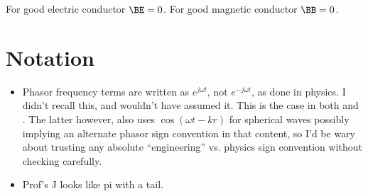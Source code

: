 For good electric conductor \( \BE = 0 \).
For good magnetic conductor \( \BB = 0 \).

\section{Notation}

\begin{itemize}
\item Phasor frequency terms are written as \( e^{j \omega t} \), not \( e^{-j \omega t} \), as done in physics.  I didn't recall this, and wouldn't have assumed it.  This is the case in both \citep{jackson1975cew:simpleRadiating} and \citep{griffiths1999introduction:waves}.  The latter however, also uses \( \cos(\omega t - k r) \) for spherical waves possibly implying an alternate phasor sign convention in that content, so I'd be wary about trusting any absolute ``engineering'' vs. physics sign convention without checking carefully.
\item Prof's J looks like pi with a tail.
\end{itemize}

\EndArticle
